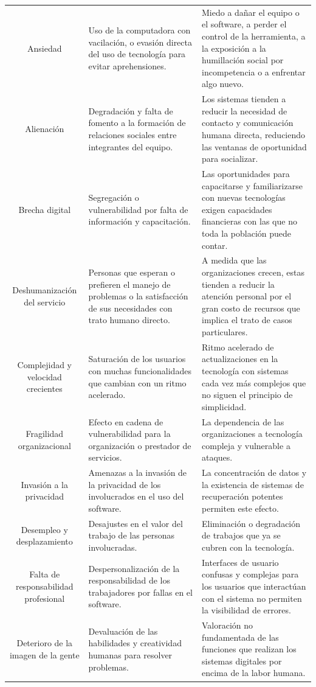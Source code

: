 \begin{longtable}[c]{c p{4cm} p{6cm}}
Ansiedad & Uso de la computadora con vacilación, o evasión directa del uso de tecnología para evitar aprehensiones. & Miedo a dañar el equipo o el software, a perder el control de la herramienta, a la exposición a la humillación social por incompetencia o a enfrentar algo nuevo. \\
\addlinespace
Alienación & Degradación y falta de fomento a la formación de relaciones sociales entre integrantes del equipo. & Los sistemas tienden a reducir la necesidad de contacto y comunicación humana directa, reduciendo las ventanas de oportunidad para socializar. \\
\addlinespace
Brecha digital & Segregación o vulnerabilidad por falta de información y capacitación. & Las oportunidades para capacitarse y familiarizarse con nuevas tecnologías exigen capacidades financieras con las que no toda la población puede contar. \\
\addlinespace
Deshumanización del servicio & Personas que esperan o prefieren el manejo de problemas o la satisfacción de sus necesidades con trato humano directo. & A medida que las organizaciones crecen, estas tienden a reducir la atención personal por el gran costo de recursos que implica el trato de casos particulares. \\
\addlinespace
Complejidad y velocidad crecientes & Saturación de los usuarios con muchas funcionalidades que cambian con un ritmo acelerado. & Ritmo acelerado de actualizaciones en la tecnología con sistemas cada vez más complejos que no siguen el principio de simplicidad. \\
\addlinespace
Fragilidad organizacional & Efecto en cadena de vulnerabilidad para la organización o prestador de servicios. & La dependencia de las organizaciones a tecnología compleja y vulnerable a ataques. \\
\addlinespace
Invasión a la privacidad & Amenazas a la invasión de la privacidad de los involucrados en el uso del software. & La concentración de datos y la existencia de sistemas de recuperación potentes permiten este efecto. \\
\addlinespace
Desempleo y desplazamiento & Desajustes en el valor del trabajo de las personas involucradas. & Eliminación o degradación de trabajos que ya se cubren con la tecnología. \\
\addlinespace
Falta de responsabilidad profesional & Despersonalización de la responsabilidad de los trabajadores por fallas en el software. & Interfaces de usuario confusas y complejas para los usuarios que interactúan con el sistema no permiten la visibilidad de errores. \\
\addlinespace
Deterioro de la imagen de la gente & Devaluación de las habilidades y creatividad humanas para resolver problemas. & Valoración no fundamentada de las funciones que realizan los sistemas digitales por encima de la labor humana. \\
\end{longtable}
\endgroup

